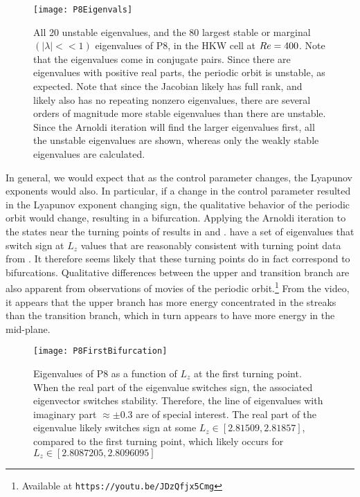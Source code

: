 \begin{figure}[h]
\texttt{[image: P8Eigenvals]}
\caption{All 20 unstable eigenvalues, and the 80 largest stable or marginal $(|\lambda| << 1)$ eigenvalues of P8, in the HKW cell at $Re=400$. Note that the eigenvalues come in conjugate pairs. Since there are eigenvalues with positive real parts, the periodic orbit is unstable, as expected. Note that since the Jacobian likely has full rank, and likely also has no repeating nonzero eigenvalues, there are several orders of magnitude more stable eigenvalues than there are unstable. Since the Arnoldi iteration will find the larger eigenvalues first, all the unstable eigenvalues are shown, whereas only the weakly stable eigenvalues are calculated.}\label{fig:P8Eigenvals}
\end{figure}

In general, we would expect that as the control parameter changes, the Lyapunov exponents would also. In particular, if a change in the control parameter resulted in the Lyapunov exponent changing sign, the qualitative behavior of the periodic orbit would change, resulting in a bifurcation. Applying the Arnoldi iteration to the states near the turning points of  results in  and . 
\clearpage
  have a set of eigenvalues that switch sign at $L_z$ values that are reasonably consistent with turning point data from . It therefore seems likely that these turning points do in fact correspond to bifurcations. Qualitative differences between the upper and transition branch are also apparent from observations of movies of the periodic orbit.\footnote{Available at {\tt https://youtu.be/JDzQfjx5Cmg}} From the video, it appears that the upper branch has more energy concentrated in the streaks than the transition branch, which in turn appears to have more energy in the mid-plane. \\

\begin{figure}[t]
\texttt{[image: P8FirstBifurcation]}
\caption{Eigenvalues of P8 as a function of $L_z$ at the first turning point. When the real part of the eigenvalue switches sign, the associated eigenvector switches stability. Therefore, the line of eigenvalues with imaginary part  $\approx \pm 0.3$ are of special interest.  The real part of the eigenvalue likely switches sign at some $L_z \in [2.81509,2.81857]$, compared to the first turning point, which likely occurs for $L_z \in [2.8087205, 2.8096095]$  }\label{fig:P8FirstBifurcation}
\end{figure}


